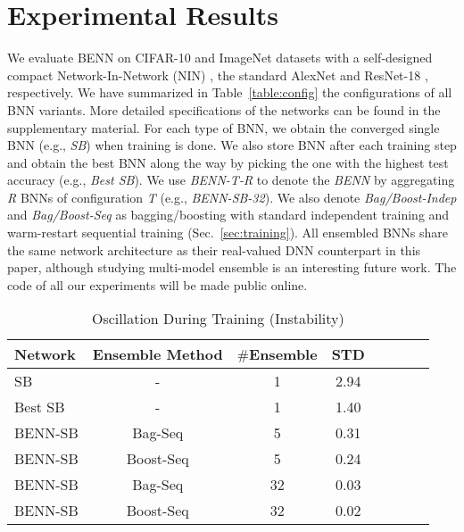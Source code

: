 \documentclass[10pt,twocolumn,letterpaper]{article}
\begin{document}
\section{Experimental Results}
\label{sec:experiments}
We evaluate BENN on CIFAR-10 and ImageNet datasets with a self-designed compact Network-In-Network (NIN) \cite{lin2013network}, the standard AlexNet \cite{krizhevsky2012imagenet} and ResNet-18 \cite{he2016deep}, respectively. We have summarized in Table~\ref{table:config} the configurations of all BNN variants. More detailed specifications of the networks can be found in the supplementary material. For each type of BNN, we obtain the converged single BNN (e.g., \textit{SB}) when training is done. We also store BNN after each training step and obtain the best BNN along the way by picking the one with the highest test accuracy (e.g., \textit{Best SB}). We use \textit{BENN-T-R} to denote the \textit{BENN} by aggregating \textit{R} BNNs of configuration \textit{T} (e.g., \textit{BENN-SB-32}). We also denote \textit{Bag/Boost-Indep} and \textit{Bag/Boost-Seq} as bagging/boosting with standard independent training and warm-restart sequential training (Sec.~\ref{sec:training}). All ensembled BNNs share the same network architecture as their real-valued DNN counterpart in this paper, although studying multi-model ensemble is an interesting future work. The code of all our experiments will be made public online.

\begin{table}
    \vspace{-3mm}
        \caption{Oscillation During Training (Instability)}
        \centering
        \scriptsize
        \begin{tabular}{lccccccr}
            \toprule
            \toprule
            Network & Ensemble Method & $\#$Ensemble & STD\\
            \midrule
            \multirow{1}{1.2cm}{SB} & - & 1 & 2.94\\
            \hline
            \multirow{1}{1.2cm}{Best SB}  & - & 1 & 1.40 \\
            \hline
            \multirow{1}{1.2cm}{BENN-SB} & Bag-Seq & 5 & 0.31 \\
            \hline
            \multirow{1}{1.2cm}{BENN-SB} & Boost-Seq & 5 & 0.24 \\
            \hline
            \multirow{1}{1.2cm}{BENN-SB} & Bag-Seq & 32 & 0.03 \\
            \hline
            \multirow{1}{1.2cm}{BENN-SB} & Boost-Seq & 32 & 0.02 \\
            \hline

            \hline
            \bottomrule
        \end{tabular}
        \label{table:osci_tab}
        \vspace{-5mm}
\end{table}
\end{document}

